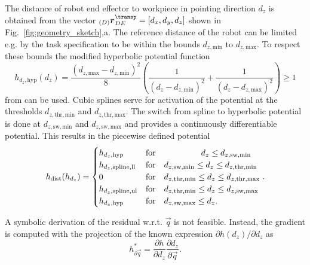 \documentclass[graybox,vecphys]{svmult}
\newcommand{\ortvek}[4]{{ }_{(#1)}{\boldsymbol{#2}}^{#3}_{#4} }
\begin{document}
The distance of robot end effector to workpiece in pointing direction $d_z$ is obtained from the vector $\ortvek{D}{r}{\transp}{DE} = [d_x,d_y,d_z]$ shown in Fig.~\ref{fig:geometry_sketch},a.
The reference distance of the robot can be limited e.g. by the task specification to be within the bounds $d_{z,\mathrm{min}}$ to $d_{z,\mathrm{max}}$.
To respect these bounds the modified hyperbolic potential function
%
\begin{equation}
h_{d_z,\mathrm{hyp}}(d_z)
=
\frac{(d_{z,\mathrm{max}}-d_{z,\mathrm{min}})^2}{8}
\left(
\frac{1}{(d_{z}-d_{z,\mathrm{min}})^2}
+
\frac{1}{(d_{z}-d_{z,\mathrm{max}})^2}
\right)
\ge 1
\label{equ:h_dz_hyp}
\end{equation}
%
from \cite{ZhuQuCaoYan2013}
can be used.
%
Cubic splines serve for activation of the potential at the thresholds $d_{z,\mathrm{thr,min}}$ and $d_{z,\mathrm{thr,max}}$. 
The switch from spline to hyperbolic potential is done at $d_{z,\mathrm{sw,min}}$ and $d_{z,\mathrm{sw,max}}$ and provides a continuously differentiable potential.
This results in the piecewise defined potential
%
\begin{equation}
h_{\mathrm{dist}}(h_{d_z})
=
\begin{cases} 
h_{d_z,\mathrm{hyp}} & \mathrm{for} \quad \hphantom{d_{z,\mathrm{sw,min}}} \hphantom{\leq} d_z \leq d_{z,\mathrm{sw,min}} \\
h_{d_z,\mathrm{spline,ll}} & \mathrm{for} \quad d_{z,\mathrm{sw,min}} \leq d_z\leq d_{z,\mathrm{thr,min}} \\
0 & \mathrm{for} \quad d_{z,\mathrm{thr,min}} \leq d_z\leq d_{z,\mathrm{thr,max}} \\
h_{d_z,\mathrm{spline,ul}} & \mathrm{for} \quad d_{z,\mathrm{thr,min}} \leq d_z \leq d_{z,\mathrm{sw,max}} \\
h_{d_z,\mathrm{hyp}} & \mathrm{for} \quad d_{z,\mathrm{sw,max}} \leq d_z.
\end{cases}.
\label{equ:h_dist_pw}
\end{equation}

A symbolic derivation of the residual w.r.t. $\vec{q}$ is not feasible.
Instead, the gradient is computed with the projection of the known expression $\partial h(d_z)/\partial d_z$ as
%
\begin{equation}
h_{\partial \vec{q}}^{*} 
= 
\frac{\partial h}{\partial d_z} 
\frac{\partial d_z}{\partial \vec{q}}.
\label{eq:grad_proj_dqdz}
\end{equation}
\end{document}
